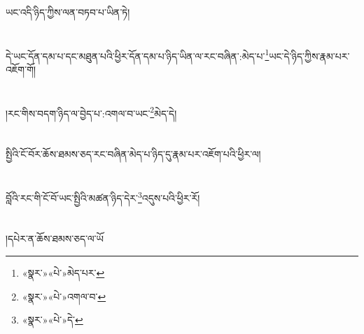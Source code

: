 ཡང་འདི་ཉིད་ཀྱིས་ལན་བཏབ་པ་ཡིན་ཏེ།\chapter{ }དེ་ཡང་དོན་དམ་པ་དང་མཐུན་པའི་ཕྱིར་དོན་དམ་པ་ཉིད་ཡིན་ལ་རང་བཞིན་:མེད་པ་\footnote{«སྣར་»«པེ་»མེད་པར་}ཡང་དེ་ཉིད་ཀྱིས་རྣམ་པར་འཇོག་གོ།\chapter{ }།རང་གིས་བདག་ཉིད་ལ་བྱེད་པ་:འགལ་བ་ཡང་\footnote{«སྣར་»«པེ་»འགལ་བ་}མེད་དེ།\chapter{ }སྤྱིའི་ངོ་བོར་ཆོས་ཐམས་ཅད་རང་བཞིན་མེད་པ་ཉིད་དུ་རྣམ་པར་འཇོག་པའི་ཕྱིར་ལ།\chapter{ }བློའི་རང་གི་ངོ་བོ་ཡང་སྤྱིའི་མཚན་ཉིད་དེར་\footnote{«སྣར་»«པེ་»དེ་}འདུས་པའི་ཕྱིར་རོ།\chapter{ }།དཔེར་ན་ཆོས་ཐམས་ཅད་ལ་ཡོ